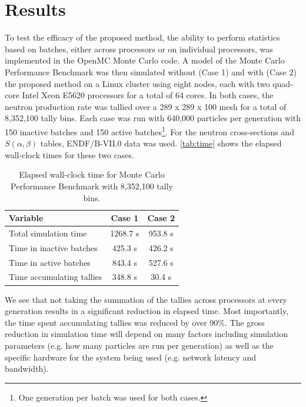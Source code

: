 \section{Results}

To test the efficacy of the proposed method, the ability to perform statistics
based on batches, either across processors or on individual processors, was
implemented in the OpenMC Monte Carlo code. A model of the Monte Carlo
Performance Benchmark \cite{mc-hoogenboom-2011} was then simulated without (Case
1) and with (Case 2) the proposed method on a Linux cluster using eight nodes,
each with two quad-core Intel Xeon E5620 processors for a total of 64 cores. In
both cases, the neutron production rate was tallied over a 289 x 289 x 100 mesh
for a total of 8,352,100 tally bins. Each case was run with 640,000 particles
per generation with 150 inactive batches and 150 active batches\footnote{One
  generation per batch was used for both cases.}. For the neutron cross-sections
and $S(\alpha,\beta)$ tables, ENDF/B-VII.0 data was used. \autoref{tab:time}
shows the elapsed wall-clock times for these two cases.
\begin{table}[bt]
  \centering
  \caption{Elapsed wall-clock time for Monte Carlo Performance Benchmark with
    8,352,100 tally bins.}
  \label{tab:time}
  \begin{tabular}{lcc}
    \toprule
    Variable & Case 1 & Case 2 \\
    \midrule
    Total simulation time     & 1268.7 s & 953.8 s \\
    Time in inactive batches  &  425.3 s & 426.2 s \\
    Time in active batches    &  843.4 s & 527.6 s \\
    Time accumulating tallies &  348.8 s &  30.4 s \\
    \bottomrule
  \end{tabular}
\end{table}
We see that not taking the summation of the tallies across processors at every
generation results in a significant reduction in elapsed time. Most importantly,
the time spent accumulating tallies was reduced by over 90\%. The gross
reduction in simulation time will depend on many factors including simulation
parameters (e.g. how many particles are run per generation) as well as the
specific hardware for the system being used (e.g. network latency and
bandwidth).

